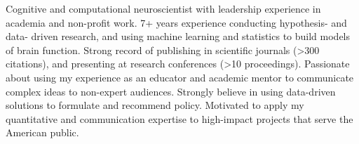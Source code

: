 

\begin{cvparagraph}

Cognitive and computational neuroscientist with leadership experience in academia and non-profit work. 7+ years experience conducting hypothesis- and data- driven research, and using machine learning and statistics to build models of brain function. Strong record of publishing in scientific journals (>300 citations), and presenting at research conferences (>10 proceedings). Passionate about using my experience as an educator and academic mentor to communicate complex ideas to non-expert audiences. Strongly believe in using data-driven solutions to formulate and recommend policy. Motivated to apply my quantitative and communication expertise to high-impact projects that serve the American public. 

\end{cvparagraph}
